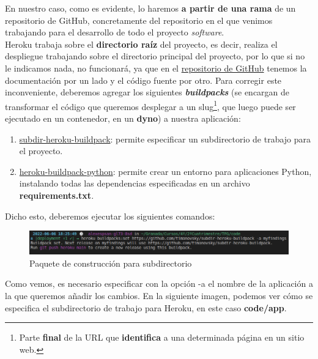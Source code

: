 En nuestro caso, como es evidente, lo haremos \textbf{a partir de una rama} de un
repositorio de GitHub, concretamente del repositorio en el que venimos trabajando
para el desarrollo de todo el proyecto \textit{software}.\\

Heroku trabaja sobre el \textbf{directorio raíz} del proyecto, es decir, realiza el
despliegue trabajando sobre el directorio principal del proyecto, por lo que si no le
indicamos nada, no funcionará, ya que en el \href{https://github.com/alexespana/TFG}
{repositorio de GitHub} tenemos la documentación por un lado y el código fuente por
otro. Para corregir este inconveniente, deberemos agregar los siguientes
\textbf{\textit{buildpacks}} (se encargan de transformar el código que queremos desplegar
a un slug\footnote{Parte \textbf{final} de la URL que \textbf{identifica} a una
determinada página en un sitio web.}, que luego puede ser ejecutado en un contenedor, en
un \textbf{dyno}) a nuestra aplicación:

    \begin{enumerate}
        \item \href{https://elements.heroku.com/buildpacks/timanovsky/subdir-heroku-buildpack}
        {subdir-heroku-buildpack}: permite especificar un subdirectorio de trabajo
        para el proyecto.
        \item \href{https://elements.heroku.com/buildpacks/heroku/heroku-buildpack-python}
        {heroku-buildpack-python}: permite crear un entorno para aplicaciones Python,
        instalando todas las dependencias especificadas en un archivo
        \textbf{requirements.txt}.
    \end{enumerate}

Dicho esto, deberemos ejecutar los siguientes comandos:

    \begin{figure}[H]
        \centering
        \includegraphics[scale=0.39]{imagenes/first-buildpack.png}
        \caption{Paquete de construcción para subdirectorio}
        \label{fig:subdir-heroku-buildpack}
    \end{figure}

Como vemos, es necesario especificar con la opción -a el nombre de la aplicación a la que
queremos añadir los cambios. En la siguiente imagen, podemos ver cómo se especifica el
subdirectorio de trabajo para Heroku, en este caso \textbf{code/app}.


